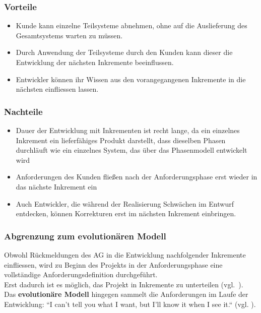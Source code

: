 \subsubsection*{Vorteile}

\begin{itemize}
    \item Kunde kann einzelne Teilsysteme abnehmen, ohne auf die Auslieferung des Gesamtsystems warten zu müssen.
    \item Durch Anwendung der Teilsysteme durch den Kunden kann dieser die Entwicklung der nächsten Inkremente beeinflussen.
    \item Entwickler können ihr Wissen aus den vorangegangenen Inkremente in die nächsten einfliessen lassen.
\end{itemize}

\subsubsection*{Nachteile}

\begin{itemize}
    \item Dauer der Entwicklung mit Inkrementen ist recht lange, da ein einzelnes Inkrement ein lieferfähiges Produkt darstellt, dass dieselben Phasen durchläuft wie ein einzelnes System, das über das Phasenmodell entwickelt wird
    \item Anforderungen des Kunden fließen nach der Anforderungsphase erst wieder in das nächste Inkrement ein
    \item Auch Entwickler, die während der Realisierung Schwächen im Entwurf entdecken, können Korrekturen erst im nächsten Inkrement einbringen.
\end{itemize}

\subsubsection*{Abgrenzung zum evolutionären Modell}
Obwohl Rückmeldungen des AG in die Entwicklung nachfolgender Inkremente einfliessen, wird zu Beginn des Projekts in der Anforderungsphase eine vollständige Anforderungsdefinition durchgeführt.\\
Erst dadurch ist es möglich, das Projekt in Inkremente zu unterteilen (vgl.~\cite[529]{Bal08}).\\

\noindent
Das \textbf{evolutionäre Modell} hingegen sammelt die Anforderungen im Laufe der Entwicklung: ``I can't tell you what I want, but I'll know it when I see it.`` (vgl. \cite[530]{Bal08}).